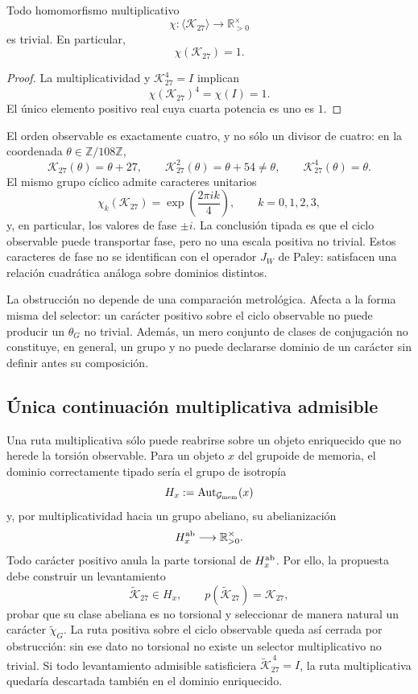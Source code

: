\begin{theorem}
\label{thm:no-go-chi-G-observable}
Todo homomorfismo multiplicativo
\[
 \chi:\langle\mathcal K_{27}\rangle
 \longrightarrow\mathbb R_{>0}^{\times}
\]
es trivial. En particular,
\[
 \chi(\mathcal K_{27})=1.
\]
\end{theorem}

\begin{proof}
La multiplicatividad y \(\mathcal K_{27}^{4}=I\) implican
\[
 \chi(\mathcal K_{27})^4=\chi(I)=1.
\]
El único elemento positivo real cuya cuarta potencia es uno es \(1\).
\end{proof}

El orden observable es exactamente cuatro, y no sólo un divisor de cuatro:
en la coordenada \(\theta\in\mathbb Z/108\mathbb Z\),
\[
 \mathcal K_{27}(\theta)=\theta+27,
 \qquad
 \mathcal K_{27}^{2}(\theta)=\theta+54\neq\theta,
 \qquad
 \mathcal K_{27}^{4}(\theta)=\theta.
\]
El mismo grupo cíclico admite caracteres unitarios
\[
 \chi_k(\mathcal K_{27})
 =\exp\!\left(\frac{2\pi i k}{4}\right),
 \qquad k=0,1,2,3,
\]
y, en particular, los valores de fase \(\pm i\). La conclusión tipada es
que el ciclo observable puede transportar fase, pero no una escala positiva
no trivial. Estos caracteres de fase no se identifican con el operador
\(J_W\) de Paley: satisfacen una relación cuadrática análoga sobre dominios
distintos.

La obstrucción no depende de una comparación metrológica. Afecta a la forma
misma del selector: un carácter positivo sobre el ciclo observable no puede
producir un \(\theta_G\) no trivial. Además, un mero conjunto de clases de
conjugación no constituye, en general, un grupo y no puede declararse dominio
de un carácter sin definir antes su composición.

\subsection{Única continuación multiplicativa admisible}

Una ruta multiplicativa sólo puede reabrirse sobre un objeto enriquecido que
no herede la torsión observable. Para un objeto \(x\) del grupoide de memoria,
el dominio correctamente tipado sería el grupo de isotropía
\[
 H_x:=\operatorname{Aut}_{\mathcal G_{\rm mem}}(x)
\]
y, por multiplicatividad hacia un grupo abeliano, su abelianización
\[
 H_x^{\rm ab}\longrightarrow\mathbb R_{>0}^{\times}.
\]
Todo carácter positivo anula la parte torsional de \(H_x^{\rm ab}\). Por ello,
la propuesta debe construir un levantamiento
\[
 \widetilde{\mathcal K}_{27}\in H_x,
 \qquad
 p(\widetilde{\mathcal K}_{27})=\mathcal K_{27},
\]
probar que su clase abeliana es no torsional y seleccionar de manera natural
un carácter \(\widetilde\chi_G\). La ruta positiva sobre el ciclo observable
queda así cerrada por obstrucción: sin ese dato no torsional no existe un
selector multiplicativo no trivial. Si todo levantamiento admisible
satisficiera
\(\widetilde{\mathcal K}_{27}^{\,4}=I\), la ruta multiplicativa quedaría
descartada también en el dominio enriquecido.


